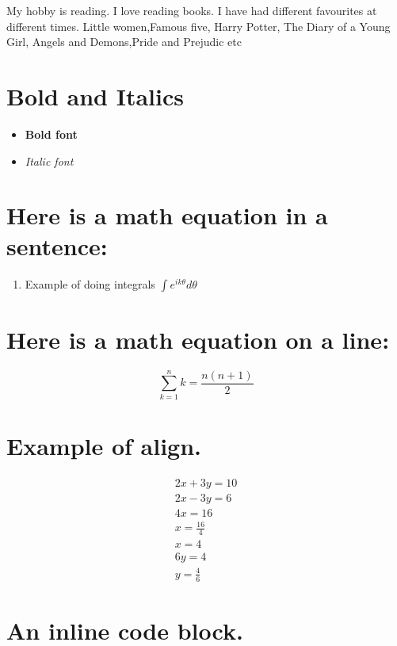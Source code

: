 \documentclass{article}
\begin{document}
My hobby is reading. I love reading books. I have had different favourites at different times. Little women,Famous five, Harry Potter, The Diary of a Young Girl, Angels and Demons,Pride and Prejudic etc

\section*{Bold and Italics}
\begin{itemize}
\item \textbf {Bold font}
\item \textit {Italic font}
\end{itemize}

\section*{Here is a math equation in a sentence:}




\begin{enumerate}
\item Example of doing integrals $\int e^{i k \theta} d \theta$
\end{enumerate} 


\section*{Here is a math equation on a line:}


\begin{equation}
\sum_{k=1}^{n} k= \frac {n (n+1)}{2}
\end{equation}



\section*{Example of align.}



\begin{align}
2x+3y=10\\
2x-3y=6\\
4x=16\\
x=\frac {16}{4}\\
x=4\\
6y=4\\
y=\frac {4}{6}
\end{align}


\section*{An inline code block.}
\end{document}
